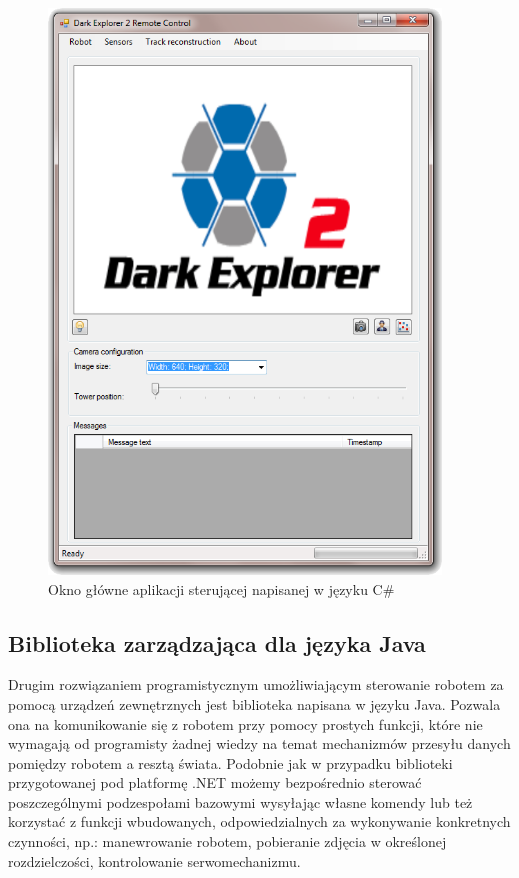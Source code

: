\begin{figure}[!ht]
 \centering
 \includegraphics[height=150mm]{../images/ch05/win-ctrl-app.png}
 \caption{Okno główne aplikacji sterującej napisanej w języku C\#}
 \label{fig:win-ctrl-app}
\end{figure}

\newpage

\subsection{Biblioteka zarządzająca dla języka Java}
\label{subsec:sdk-java}
Drugim rozwiązaniem programistycznym umożliwiającym sterowanie robotem za pomocą
urządzeń zewnętrznych jest biblioteka napisana w języku Java. Pozwala ona na
komunikowanie się z robotem przy pomocy prostych funkcji, które nie wymagają od
programisty żadnej wiedzy na temat mechanizmów przesyłu danych pomiędzy robotem a
resztą świata. Podobnie jak w przypadku biblioteki przygotowanej pod platformę
.NET możemy bezpośrednio sterować poszczególnymi podzespołami bazowymi wysyłając
własne komendy lub też korzystać z funkcji wbudowanych, odpowiedzialnych za
wykonywanie konkretnych czynności, np.: manewrowanie robotem, pobieranie zdjęcia
w określonej rozdzielczości, kontrolowanie serwomechanizmu.

